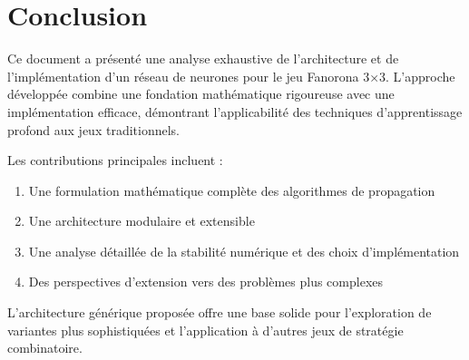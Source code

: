 \documentclass[12pt,a4paper]{report}
\numberwithin{equation}{section}
\begin{document}

\chapter{Conclusion}

Ce document a présenté une analyse exhaustive de l'architecture et de l'implémentation d'un réseau de neurones pour le jeu Fanorona 3×3. L'approche développée combine une fondation mathématique rigoureuse avec une implémentation efficace, démontrant l'applicabilité des techniques d'apprentissage profond aux jeux traditionnels.

Les contributions principales incluent :
\begin{enumerate}
  \item Une formulation mathématique complète des algorithmes de propagation
  \item Une architecture modulaire et extensible
  \item Une analyse détaillée de la stabilité numérique et des choix d'implémentation
  \item Des perspectives d'extension vers des problèmes plus complexes
\end{enumerate}

L'architecture générique proposée offre une base solide pour l'exploration de variantes plus sophistiquées et l'application à d'autres jeux de stratégie combinatoire.



\end{document}
